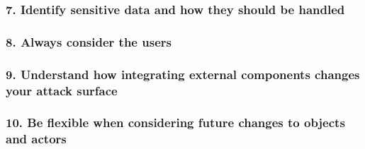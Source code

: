 \documentclass[t]{beamer}
\begin{document}
\begin{frame}

	\frametitle{7. Identify sensitive data and how they should be handled}
	

\end{frame}

\begin{frame}

	\frametitle{8. Always consider the users}
	

\end{frame}

\begin{frame}

	\frametitle{9. Understand how integrating external components changes your attack surface}
	

\end{frame}

\begin{frame}

	\frametitle{10. Be flexible when considering future changes to objects and actors}
	

\end{frame}



\end{document}
